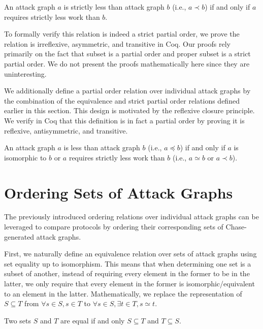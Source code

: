 \documentclass[runningheads]{llncs}
\theoremstyle{definition}
\begin{document}
\begin{definition}
    An attack graph $a$ is strictly less than attack graph $b$ (i.e., $a \prec b$) if and only if $a$ requires strictly less work than $b$.
\end{definition}

To formally verify this relation is indeed a strict partial order, we prove the relation is irreflexive, asymmetric, and transitive in Coq. Our proofs rely primarily on the fact that subset is a partial order and proper subset is a strict partial order. We do not present the proofs mathematically here since they are uninteresting.

We additionally define a partial order relation over individual attack graphs by the combination of the equivalence and strict partial order relations defined earlier in this section. This design is motivated by the reflexive closure principle. We verify in Coq that this definition is in fact a partial order by proving it is reflexive, antisymmetric, and transitive.

\begin{definition}
  An attack graph $a$ is less than attack graph $b$ (i.e., $a \preceq b$) if and only if $a$ is isomorphic to $b$ or $a$ requires strictly less work than $b$ (i.e., $a \simeq b$ or $a \prec b$).
\end{definition}


\section{Ordering Sets of Attack Graphs}

The previously introduced ordering relations over individual attack graphs can be leveraged to compare protocols by ordering their corresponding sets of Chase-generated attack graphs. 

First, we naturally define an equivalence relation over sets of attack graphs using set equality up to isomorphism. This means that when determining one set is a subset of another, instead of requiring every element in the former to be in the latter, we only require that every element in the former is isomorphic/equivalent to an element in the latter. Mathematically, we replace the representation of $S \subseteq T$ from $\forall s \in S, s \in T$ to $\forall s \in S, \exists t \in T, s \simeq t$.

\begin{definition}
  Two sets $S$ and $T$ are equal if and only $S \subseteq T$ and $T \subseteq S$.
\end{definition}
\end{document}
